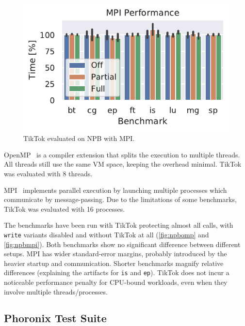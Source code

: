 \documentclass[conference]{IEEEtran}
\newcommand{\sysname}{TikTok}
\begin{document}
\begin{figure}[]
  \centering
  \includegraphics[width=\linewidth]{img/mpi_graph.pdf}
  \caption{\sysname{} evaluated on NPB with MPI.}
  \label{fig:npbmpi}
\end{figure}


OpenMP~\cite{dagum1998openmp} is a compiler extension that splits the execution
to multiple threads. All threads still use the same VM space, keeping the
overhead minimal. \sysname{} was evaluated with 8 threads.

MPI~\cite{snir1998mpi} implements parallel execution by launching multiple
processes which communicate by message-passing. Due to the limitations of some
benchmarks, \sysname{} was evaluated with 16 processes.

The benchmarks have been run with \sysname{} protecting almost all calls, with
\texttt{write} variants disabled and without \sysname{} at all
(\autoref{fig:npbomp} and \autoref{fig:npbmpi}). Both benchmarks show no
significant difference between different setups. MPI has wider standard-error
margins, probably introduced by the heavier startup and communication. Shorter
benchmarks magnify relative differences (explaining the artifacts for
\texttt{is} and \texttt{ep}). \sysname{} does not incur a noticeable performance
penalty for CPU-bound workloads, even when they involve multiple
threads/processes.

\subsection{Phoronix Test Suite}
\label{subsec:phoronix}
\end{document}
